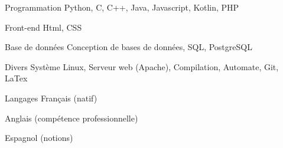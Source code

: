 

\begin{cvskills}
  \cvskill
    {Programmation} %
    {Python, C, C++, Java, Javascript, Kotlin, PHP} %

  \cvskill
  {Front-end} %
  {Html, CSS} %

  \cvskill
    {Base de données} %
    {Conception de bases de données, SQL, PostgreSQL} %

  \cvskill
    {Divers} %
    {Système Linux, Serveur web (Apache), Compilation, Automate, Git, LaTex} %

  \cvskill
    {Langages} %
    {Français (natif)} %

  \cvskill
    {} %
    {Anglais (compétence professionnelle)} %

  \cvskill
    {} %
    {Espagnol (notions)} %


\end{cvskills}
